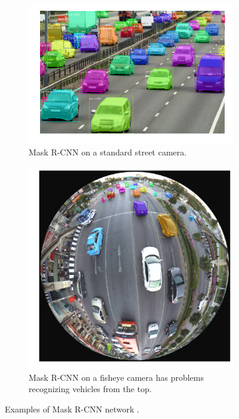 \documentclass[a4paper,11pt,titlepage,twoside]{article}
\numberwithin{figure}{section}
\begin{document}
\begin{figure}[h!]
    \begin{subfigure}[Sample1]{0.47\linewidth}
        \includegraphics[width=0.95\linewidth]{fig/Mask-RCNN-road.png} 
        \caption{Mask R-CNN on a standard street camera.}
        \label{fig:mask-street-cam}
    \end{subfigure}
    \quad
    \begin{subfigure}[Sample1]{0.47\linewidth} 
        \includegraphics[width=0.95\linewidth]{fig/Mask-RCNN-omni.png}
        \caption{Mask R-CNN on a fisheye camera has problems recognizing vehicles from the top.}   
        \label{fig:mask-omni-cam}
    \end{subfigure}
    \caption{Examples of Mask R-CNN network \cite{he2017mask}.}
    \label{fig:facenet}
\end{figure}
\end{document}
